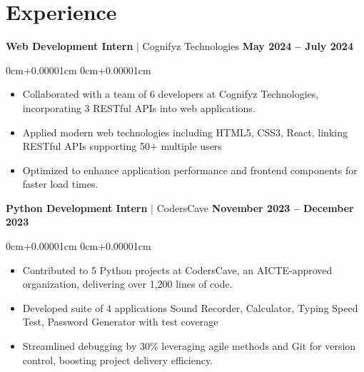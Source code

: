 \documentclass[10pt,a4paper]{article}
\newenvironment{highlights}{
    \begin{itemize}[
        topsep=0.10cm,
        parsep=0.10cm,
        partopsep=0pt,
        itemsep=0pt,
        leftmargin=10pt,
    ]
    }{
    \end{itemize}
}
\newenvironment{onecolentry}{
    \begin{adjustwidth}{
        0cm+0.00001cm
    }{
        0cm+0.00001cm
    }
    }{
    \end{adjustwidth}
}
\begin{document}
    \section{Experience}\label{sec:experience}

    \textbf{Web Development Intern} | Cognifyz Technologies \hfill \textbf{May 2024 -- July 2024} \\
    \begin{onecolentry}
        \begin{highlights}
            \vspace{0.01cm}
            \item Collaborated with a team of 6 developers at Cognifyz Technologies, incorporating 3 RESTful APIs into web applications.
            \item Applied modern web technologies including HTML5, CSS3, React, linking RESTful APIs supporting 50+ multiple users
            \item Optimized to enhance application performance and frontend components for faster load times.
        \end{highlights}
    \end{onecolentry}
    \vspace{0.1cm}
    \textbf{Python Development Intern} | CodersCave \hfill \textbf{November 2023 -- December 2023} \\
    \begin{onecolentry}
        \begin{highlights}
            \vspace{0.01cm}
            \item Contributed to 5 Python projects at CodersCave, an AICTE-approved organization, delivering over 1,200 lines of code.
            \item Developed suite of 4 applications Sound Recorder, Calculator, Typing Speed Test, Password Generator with test coverage
            \item Streamlined debugging by 30\% leveraging agile methods and Git for version control, boosting project delivery efficiency. \\
        \end{highlights}
    \end{onecolentry}
\end{document}
